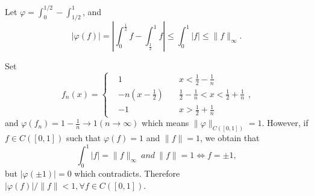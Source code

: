 \begin{enumerate}
\begin{answer}
\begin{enumerate}
        Let $\varphi = \int_0^{1/2} - \int_{1/2}^1$, and
        \[ |\varphi(f)| = |\int_0^{\frac12}f - \int_{\frac{1}{2}}^1f |\leq \int_0^1|f|\leq\|f\|_\infty. \]

        Set
        \[ f_n(x) = \left\{\begin{aligned}
            &1\quad &x < \frac12 - \frac1n\\
            &-n(x-\frac12)\quad&\frac12 - \frac1n < x < \frac12 + \frac1n\\
            &-1\quad &x > \frac12 + \frac1n
        \end{aligned}\right. ,\]
        and $\varphi(f_n) = 1 - \frac1n\to 1(n\to\infty)$ which means $\|\varphi\|_{C([0,1])} = 1$. However, if $f\in C([0, 1])$ such that $\varphi(f) = 1$ and $\|f\| = 1$, we obtain that
        \[
            \int_0^1|f| = \|f\|_\infty \ and \ \|f\|=1 \iff f = \pm 1,
        \]
        but $|\varphi(\pm1)| = 0$ which contradicts. Therefore $|\varphi(f)|/\|f\| < 1, \forall f\in C([0, 1])$.
      \end{enumerate}
    \end{answer}
\end{enumerate}


